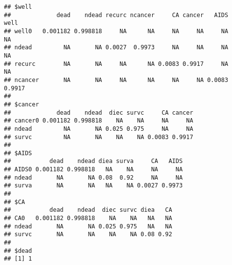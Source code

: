 \documentclass[]{book}
\newenvironment{Shaded}{\begin{snugshade}}{\end{snugshade}}
\newcommand{\DecValTok}[1]{\textcolor[rgb]{0.00,0.00,0.81}{#1}}
\newcommand{\KeywordTok}[1]{\textcolor[rgb]{0.13,0.29,0.53}{\textbf{#1}}}
\newcommand{\NormalTok}[1]{#1}
\newcommand{\OperatorTok}[1]{\textcolor[rgb]{0.81,0.36,0.00}{\textbf{#1}}}
\newcommand{\OtherTok}[1]{\textcolor[rgb]{0.56,0.35,0.01}{#1}}
\newcommand{\StringTok}[1]{\textcolor[rgb]{0.31,0.60,0.02}{#1}}
\begin{document}
\begin{Shaded}
\begin{Highlighting}[]
{{{\NormalTok{tree_probs}\OperatorTok{$}\NormalTok{CA <-}
\StringTok{  }\KeywordTok{tribble}\NormalTok{(}\OperatorTok{~}\NormalTok{rowname,}\OperatorTok{~}\NormalTok{dead, }\OperatorTok{~}\NormalTok{ndead,  }\OperatorTok{~}\NormalTok{diec, }\OperatorTok{~}\NormalTok{survc,  }\OperatorTok{~}\NormalTok{diea, }\OperatorTok{~}\NormalTok{CA,}
          \StringTok{"CA0"}\NormalTok{,   delta0,}\DecValTok{1}\OperatorTok{-}\NormalTok{delta0,}\OtherTok{NA}\NormalTok{,    }\OtherTok{NA}\NormalTok{,      }\OtherTok{NA}\NormalTok{,    }\OtherTok{NA}\NormalTok{,}
          \StringTok{"ndead"}\NormalTok{, }\OtherTok{NA}\NormalTok{,    }\OtherTok{NA}\NormalTok{,      deltac,}\DecValTok{1}\OperatorTok{-}\NormalTok{deltac,}\OtherTok{NA}\NormalTok{,    }\OtherTok{NA}\NormalTok{,}
          \StringTok{"survc"}\NormalTok{, }\OtherTok{NA}\NormalTok{,    }\OtherTok{NA}\NormalTok{,      }\OtherTok{NA}\NormalTok{,    }\OtherTok{NA}\NormalTok{,      deltaa,}\DecValTok{1}\OperatorTok{-}\NormalTok{deltaa) }\OperatorTok{%>%}\StringTok{ }
\StringTok{  }\KeywordTok{column_to_rownames}\NormalTok{()}

\NormalTok{tree_probs}\OperatorTok{$}\NormalTok{dead <-}\StringTok{ }\DecValTok{1}

\NormalTok{tree_probs}
\end{Highlighting}
\end{Shaded}

\begin{verbatim}
## $well
##             dead    ndead recurc ncancer     CA cancer   AIDS   well
## well0   0.001182 0.998818     NA      NA     NA     NA     NA     NA
## ndead         NA       NA 0.0027  0.9973     NA     NA     NA     NA
## recurc        NA       NA     NA      NA 0.0083 0.9917     NA     NA
## ncancer       NA       NA     NA      NA     NA     NA 0.0083 0.9917
## 
## $cancer
##             dead    ndead  diec survc     CA cancer
## cancer0 0.001182 0.998818    NA    NA     NA     NA
## ndead         NA       NA 0.025 0.975     NA     NA
## survc         NA       NA    NA    NA 0.0083 0.9917
## 
## $AIDS
##           dead    ndead diea surva     CA   AIDS
## AIDS0 0.001182 0.998818   NA    NA     NA     NA
## ndead       NA       NA 0.08  0.92     NA     NA
## surva       NA       NA   NA    NA 0.0027 0.9973
## 
## $CA
##           dead    ndead  diec survc diea   CA
## CA0   0.001182 0.998818    NA    NA   NA   NA
## ndead       NA       NA 0.025 0.975   NA   NA
## survc       NA       NA    NA    NA 0.08 0.92
## 
## $dead
## [1] 1
\end{verbatim}
\end{document}
